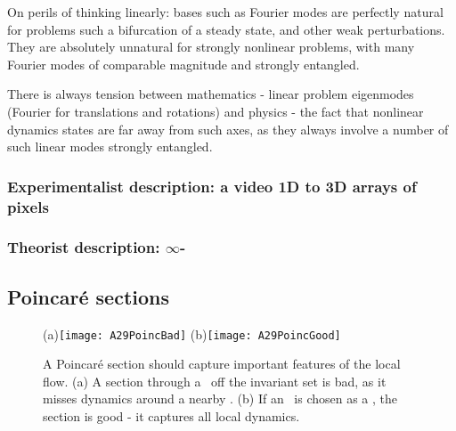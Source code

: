 
On perils of thinking linearly: bases such as Fourier modes are
perfectly natural for problems such a bifurcation of a steady state, and
other weak perturbations. They are absolutely unnatural for strongly
nonlinear problems, with many Fourier modes of comparable magnitude and
strongly entangled.

        There is always tension between mathematics - linear problem eigenmodes
        (Fourier for translations and rotations) and physics - the fact that
        nonlinear dynamics states are far away from such axes, as they
        always involve a number of such linear modes strongly entangled.

\subsubsection{Experimentalist description: a video 1D to 3D arrays of pixels}
\subsubsection{Theorist description: $\infty$-\dmn\ \statesp}

\subsection{Poincar\'e sections}
\label{s:PoincSecFlot}

\begin{figure}
   \centering
(a)\texttt{[image: A29PoincBad]}
(b)\texttt{[image: A29PoincGood]}
   \caption{\label{fig:A29PoincBad}
A Poincar\'e section should capture important features of the local flow.
    (a)
A section through a \template\ off the invariant set is bad, as it misses
dynamics around a nearby \eqv.
    (b)
If an \eqv\ is chosen as a \template, the section is good - it captures
all local dynamics.
}
\end{figure}

